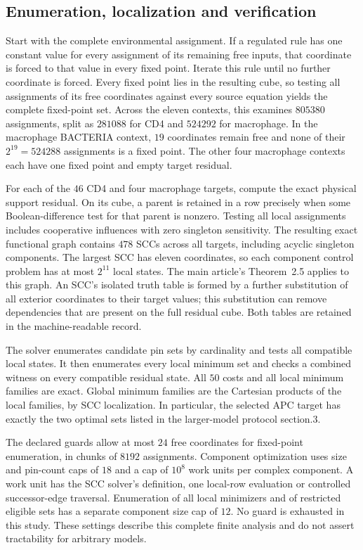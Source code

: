 \subsection{Enumeration, localization and verification}
Start with the complete environmental assignment. If a regulated rule
has one constant value for every assignment of its remaining free inputs,
that coordinate is forced to that value in every fixed point. Iterate
this rule until no further coordinate is forced. Every fixed point lies
in the resulting cube, so testing all assignments of its free coordinates
against every source equation yields the complete fixed-point set.
Across the eleven contexts, this examines $805380$ assignments, split as
$281088$ for CD4 and $524292$ for macrophage. In the
macrophage BACTERIA context, $19$ coordinates remain free and none of
their $2^{19}=524288$ assignments is a fixed point. The other four
macrophage contexts each have one fixed point and empty target residual.

For each of the $46$ CD4 and four macrophage targets, compute the exact
physical support residual. On its cube, a parent is retained in a row
precisely when some Boolean-difference test for that parent is nonzero.
Testing all local assignments includes cooperative influences with zero
singleton sensitivity. The resulting exact functional graph contains
$478$ SCCs across all targets, including acyclic singleton components.
The largest SCC has eleven coordinates, so each component control problem
has at most $2^{11}$ local states. The main article's Theorem~2.5
applies to this graph. An SCC's isolated truth table is formed by a
further substitution of all exterior coordinates to their target values;
this substitution can remove dependencies that are present on the full
residual cube. Both tables are retained in the machine-readable record.

The solver enumerates candidate pin sets by cardinality and tests all
compatible local states. It then enumerates every local minimum set and
checks a combined witness on every compatible residual state. All $50$
costs and all local minimum families are exact. Global minimum families
are the Cartesian products of the local families, by SCC localization.
In particular, the selected APC target has exactly the two optimal sets
listed in the larger-model protocol section.3.

The declared guards allow at most $24$ free coordinates for fixed-point
enumeration, in chunks of $8192$ assignments. Component optimization uses
size and pin-count caps of $18$ and a cap of $10^8$ work units per complex
component. A work unit has the SCC solver's definition, one local-row
evaluation or controlled successor-edge traversal. Enumeration of all
local minimizers and of restricted eligible sets has a separate component
size cap of $12$. No guard is exhausted in this study. These settings
describe this complete finite analysis and do not assert tractability
for arbitrary models.


